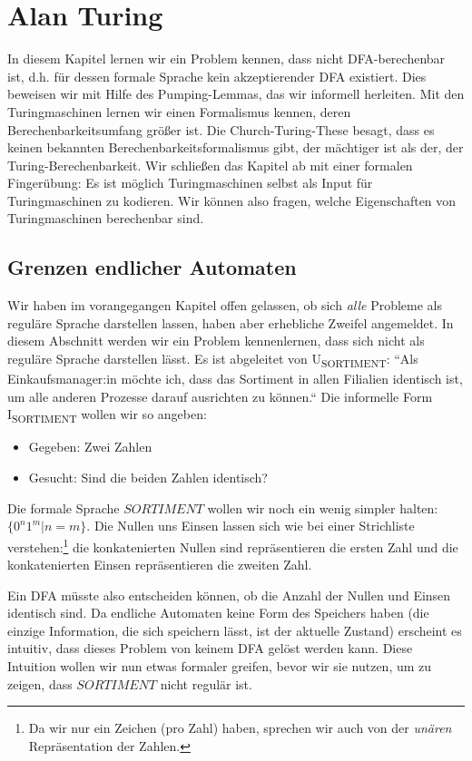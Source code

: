 \chapter{Alan Turing}\label{turing}

In diesem Kapitel lernen wir ein Problem kennen,
dass nicht DFA-berechenbar ist,
d.h. für dessen formale Sprache kein akzeptierender DFA existiert.
Dies beweisen wir mit Hilfe des Pumping-Lemmas,
das wir informell herleiten.
Mit den Turingmaschinen lernen wir einen Formalismus kennen,
deren Berechenbarkeitsumfang größer ist.
Die Church-Turing-These besagt,
dass es keinen bekannten Berechenbarkeitsformalismus gibt,
der mächtiger ist als der, der Turing-Berechenbarkeit.
Wir schließen das Kapitel ab mit einer formalen Fingerübung:
Es ist möglich Turingmaschinen selbst als Input für Turingmaschinen zu kodieren.
Wir können also fragen, welche Eigenschaften von Turingmaschinen berechenbar sind.

\section{Grenzen endlicher Automaten}\label{pumping}
Wir haben im vorangegangen Kapitel offen gelassen,
ob sich \emph{alle} Probleme als reguläre Sprache darstellen lassen,
haben aber erhebliche Zweifel angemeldet.
In diesem Abschnitt werden wir ein Problem kennenlernen,
dass sich nicht als reguläre Sprache darstellen lässt.
Es ist abgeleitet von U\textsubscript{SORTIMENT}:
``Als Einkaufsmanager:in möchte ich,
dass das Sortiment in allen Filialien identisch ist,
um alle anderen Prozesse darauf ausrichten zu können.``
Die informelle Form
I\textsubscript{SORTIMENT}
wollen wir so angeben:
\begin{itemize}
    \item Gegeben: Zwei Zahlen
    \item Gesucht: Sind die beiden Zahlen identisch?
\end{itemize}
Die formale Sprache $SORTIMENT$ wollen wir noch ein wenig simpler halten:
$\{0^n1^m|n=m\}$.
Die Nullen uns Einsen lassen sich wie bei einer Strichliste verstehen:\footnote{
    Da wir nur ein Zeichen (pro Zahl) haben,
    sprechen wir auch von der \emph{unären} Repräsentation der Zahlen.}
die konkatenierten Nullen sind repräsentieren die ersten Zahl
und die konkatenierten Einsen repräsentieren die zweiten Zahl.

Ein DFA müsste also entscheiden können, ob die Anzahl der Nullen und Einsen identisch sind.
Da endliche Automaten keine Form des Speichers haben
(die einzige Information, die sich speichern lässt, ist der aktuelle Zustand)
erscheint es intuitiv, dass dieses Problem von keinem DFA gelöst werden kann.
Diese Intuition wollen wir nun etwas formaler greifen,
bevor wir sie nutzen, um zu zeigen, dass $SORTIMENT$ nicht regulär ist.

